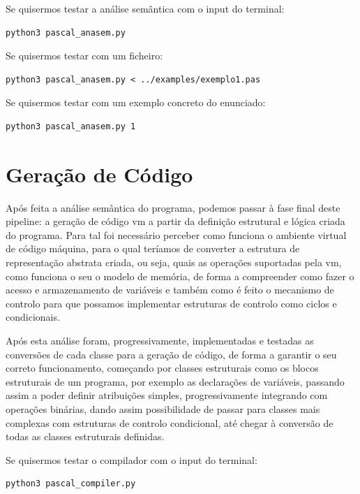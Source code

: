 \documentclass[12pt,a4paper]{report}
\begin{document}
\vspace{1em}

Se quisermos testar a análise semântica com o input do terminal:
\begin{verbatim}
python3 pascal_anasem.py
\end{verbatim}

Se quisermos testar com um ficheiro:
\begin{verbatim}
python3 pascal_anasem.py < ../examples/exemplo1.pas
\end{verbatim}

Se quisermos testar com um exemplo concreto do enunciado:
\begin{verbatim}
python3 pascal_anasem.py 1
\end{verbatim}

\chapter{Geração de Código}

Após feita a análise semântica do programa, podemos passar à fase final deste pipeline: a geração de código vm a partir da definição estrutural e lógica criada do programa.
Para tal foi necessário perceber como funciona o ambiente virtual de código máquina, para o qual teríamos de converter a estrutura de representação abstrata criada, ou seja,
quais as operações suportadas pela vm, como funciona o seu o modelo de memória, de forma a compreender como fazer o acesso e armazenamento de variáveis e também como é feito o mecanismo de controlo
para que possamos implementar estruturas de controlo como ciclos e condicionais.

Após esta análise foram, progressivamente, implementadas e testadas as conversões de cada classe para a geração de código, de forma a garantir o seu correto funcionamento, começando por classes estruturais
como os blocos estruturais de um programa, por exemplo as declarações de variáveis, passando assim a poder definir atribuições simples, progressivamente integrando com operações binárias, dando assim possibilidade
de passar para classes mais complexas com estruturas de controlo condicional, até chegar à conversão de todas as classes estruturais definidas.



\vspace{1em}

Se quisermos testar o compilador com o input do terminal:
\begin{verbatim}
python3 pascal_compiler.py
\end{verbatim}
\end{document}
